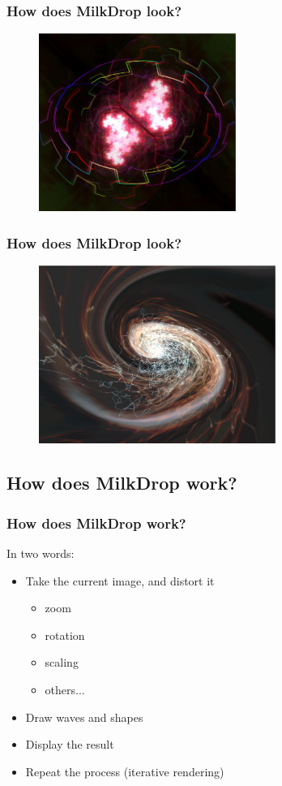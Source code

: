 \documentclass{beamer}
\begin{document}
\frame
{
  \frametitle{How does MilkDrop look?}
  \begin{figure}[H]
  \includegraphics[height=58mm]{milkdrop2.eps}
  \end{figure}
}

\frame
{
  \frametitle{How does MilkDrop look?}
  \begin{figure}[H]
  \includegraphics[height=58mm]{milkdrop3.eps}
  \end{figure}
}

\subsection{How does MilkDrop work?}
\frame
{
  \frametitle{How does MilkDrop work?}

In two words:
  \begin{itemize}
  \item Take the current image, and distort it
  \begin{itemize}
    \item zoom
    \item rotation
    \item scaling
    \item others...
  \end{itemize}
  \item Draw waves and shapes
  \item Display the result
  \item Repeat the process (iterative rendering)
  \end{itemize}
}
\end{document}
